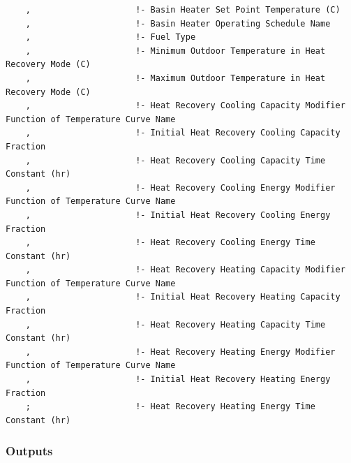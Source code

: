 \begin{lstlisting}
    ,                     !- Basin Heater Set Point Temperature (C)
    ,                     !- Basin Heater Operating Schedule Name
    ,                     !- Fuel Type
    ,                     !- Minimum Outdoor Temperature in Heat Recovery Mode (C)
    ,                     !- Maximum Outdoor Temperature in Heat Recovery Mode (C)
    ,                     !- Heat Recovery Cooling Capacity Modifier Function of Temperature Curve Name
    ,                     !- Initial Heat Recovery Cooling Capacity Fraction
    ,                     !- Heat Recovery Cooling Capacity Time Constant (hr)
    ,                     !- Heat Recovery Cooling Energy Modifier Function of Temperature Curve Name
    ,                     !- Initial Heat Recovery Cooling Energy Fraction
    ,                     !- Heat Recovery Cooling Energy Time Constant (hr)
    ,                     !- Heat Recovery Heating Capacity Modifier Function of Temperature Curve Name
    ,                     !- Initial Heat Recovery Heating Capacity Fraction
    ,                     !- Heat Recovery Heating Capacity Time Constant (hr)
    ,                     !- Heat Recovery Heating Energy Modifier Function of Temperature Curve Name
    ,                     !- Initial Heat Recovery Heating Energy Fraction
    ;                     !- Heat Recovery Heating Energy Time Constant (hr)
\end{lstlisting}

\subsubsection{Outputs}\label{outputs-039}

